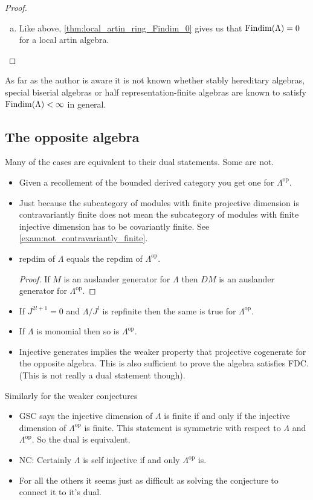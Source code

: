 \begin{theorem}
\begin{proof}
\begin{enumerate}[(a)]
			\item Like above, \cref{thm:local_artin_ring_Findim_0} gives us that $\operatorname{Findim}(\Lambda)=0$ for a local artin algebra.
		\end{enumerate}
	\end{proof}
\end{theorem}

As far as the author is aware it is not known whether stably hereditary algebras, special biserial algebras or half representation-finite algebras are known to satisfy $\operatorname{Findim}(\Lambda) < \infty$ in general.

\subsection{The opposite algebra}

Many of the cases are equivalent to their dual statements. Some are not.
\begin{itemize}
	\item Given a recollement of the bounded derived category you get one for $\Lambda^{\operatorname{op}}$. 
	\item Just because the subcategory of modules with finite projective dimension is contravariantly finite does not mean the subcategory of modules with finite injective dimension has to be covariantly finite. See \cref{exam:not_contravariantly_finite}.
	\item repdim of $\Lambda$ equals the repdim of $\Lambda^{\operatorname{op}}$.
	\begin{proof}
		If $M$ is an auslander generator for $\Lambda$ then $DM$ is an auslander generator for $\Lambda^{\operatorname{op}}$.
	\end{proof}
	\item If $J^{2l+1} = 0$ and $\Lambda/J^l$ is repfinite then the same is true for $\Lambda^{\operatorname{op}}$.
	\item If $\Lambda$ is monomial then so is $\Lambda^{\operatorname{op}}$.
	\item Injective generates implies the weaker property that projective cogenerate for the opposite algebra. This is also sufficient to prove the algebra satisfies FDC.\cite[Section~5]{Rick19} (This is not really a dual statement though).
\end{itemize}

Similarly for the weaker conjectures
\begin{itemize}
	\item GSC says the injective dimension of $\Lambda$ is finite if and only if the injective dimension of $\Lambda^{\operatorname{op}}$ is finite. This statement is symmetric with respect to $\Lambda$ and $\Lambda^{\operatorname{op}}$. So the dual is equivalent.
	\item NC: Certainly $\Lambda$ is self injective if and only $\Lambda^{\operatorname{op}}$ is. 
	\item For all the others it seems just as difficult as solving the conjecture to connect it to it's dual.
\end{itemize}
